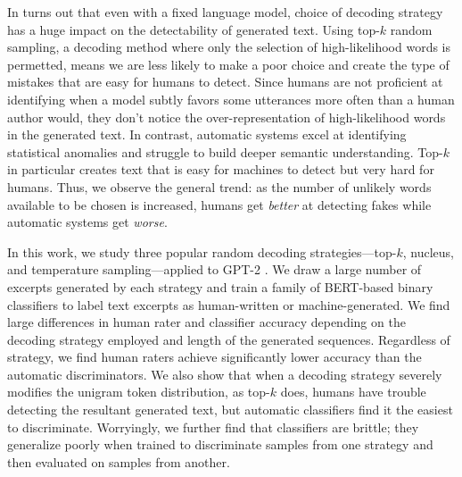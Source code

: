 In turns out that even with a fixed language model, choice of decoding strategy has a huge impact on the detectability of generated text.
Using top-$k$ random sampling, a decoding method where only the selection of high-likelihood words is permetted, means we are less likely to make a poor choice and create the type of mistakes that are easy for humans to detect.
Since humans are not proficient at identifying when a model subtly favors some utterances more often than a human author would, they don't notice the over-representation of high-likelihood words in the generated text.
In contrast, automatic systems excel at identifying statistical anomalies and struggle to build deeper semantic understanding.
Top-$k$ in particular creates text that is easy for machines to detect but very hard for humans.
Thus, we observe the general trend: as the number of unlikely words available to be chosen is increased, humans get {\em better} at detecting fakes while automatic systems get {\em worse}.

In this work, we study three popular random decoding strategies---top-$k$, nucleus, and temperature sampling---applied to GPT-2 \cite{radford2019language}.
We draw a large number of excerpts generated by each strategy and train a family of BERT-based \cite{devlin2018bert} binary classifiers to label text excerpts as human-written or machine-generated.
We find large differences in human rater and classifier accuracy depending on the decoding strategy employed and length of the generated sequences.
Regardless of strategy, we find human raters achieve significantly lower accuracy than the automatic discriminators.
We also show that when a decoding strategy severely modifies the unigram token distribution, as top-$k$ does, humans have trouble detecting the resultant generated text, but automatic classifiers find it the easiest to discriminate.
Worryingly, we further find that classifiers are brittle; they generalize poorly when trained to discriminate samples from one strategy and then evaluated on samples from another.

